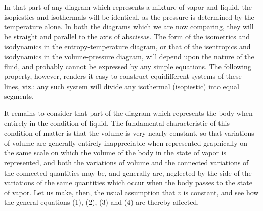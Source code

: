 \documentclass[11pt]{article}
\begin{document}
In that part of any diagram which represents a mixture of vapor and liquid, the isopiestics and isothermals will be identical, as the pressure is determined by the temperature alone. In both the diagrams which we are now comparing, they will be straight and parallel to the axis of abscissas. The form of the isometrics and isodynamics in the entropy-temperature diagram, or that of the isentropics and isodynamics in the volume-pressure diagram, will depend upon the nature of the fluid, and probably cannot be expressed by any simple equations. The following property, however, renders it easy to construct equidifferent systems of these lines, viz.: any such system will divide any isothermal (isopiestic) into equal segments.

It remains to consider that part of the diagram which represents the body when entirely in the condition of liquid. The fundamental characteristic of this condition of matter is that the volume is very nearly constant, so that variations of volume are generally entirely inappreciable when represented graphically on the same scale on which the volume of the body in the state of vapor is represented, and both the variations of volume and the connected variations of the connected quantities may be, and generally are, neglected by the side of the variations of the same quantities which occur when the body passes to the state of vapor. Let us make, then, the usual assumption that $v$ is constant, and see how the general equations (1), (2), (3) and (4) are thereby affected.
\end{document}

